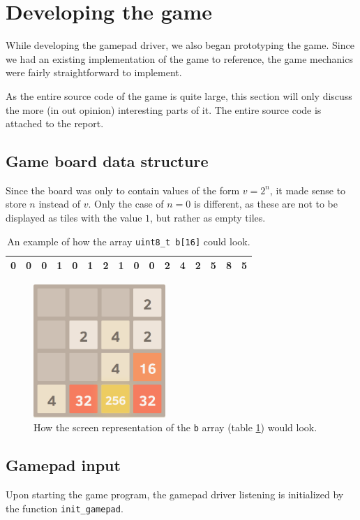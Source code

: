 \newpage
\section{Developing the game}
While developing the gamepad driver, we also began prototyping the game.
Since we had an existing implementation of the game \cite{2048} to reference,
the game mechanics were fairly straightforward to implement.

As the entire source code of the game is quite large, this section will only discuss the more (in out opinion) interesting parts of it.
The entire source code is attached to the report.

\subsection{Game board data structure\label{data_structure}}
Since the board was only to contain values of the form $v = 2^n$, it made sense to store $n$ instead of $v$. Only the case of $n = 0$ is different, as these are not to be displayed as tiles with the value $1$, but rather as empty tiles.

\begin{table}[h!]
    \centering
    \begin{tabular}{|l|l|l|l|l|l|l|l|l|l|l|l|l|l|l|l|}
        \hline
        0 & 0 & 0 & 1 & 0 & 1 & 2 & 1 & 0 & 0 & 2 & 4 & 2 & 5 & 8 & 5 \\ \hline
    \end{tabular}
    \caption{An example of how the array \texttt{uint8\_t b[16]} could look.}
    \label{array_b}
\end{table}

\begin{figure}[h!]
    \centering
    \includegraphics[width=5cm]{img/2048.png}
    \caption{How the screen representation of the \texttt{b} array (table \ref{array_b}) would look.}
\end{figure}

\newpage
\subsection{Gamepad input}
Upon starting the game program, the gamepad driver listening is initialized by the function \texttt{init\_gamepad}.

